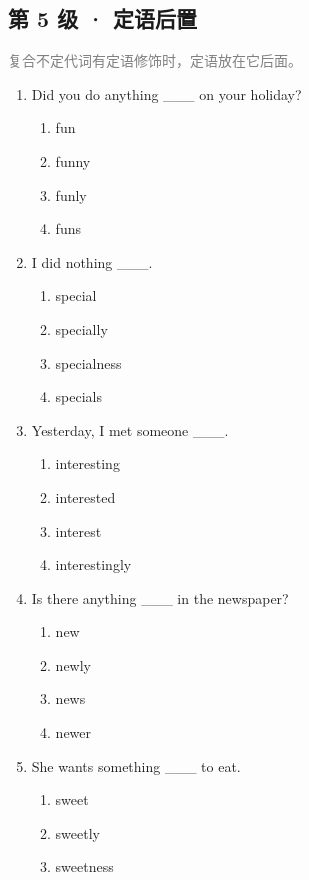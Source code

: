 \documentclass[11pt,a4paper]{ctexart}
\begin{document}
\subsection*{第 5 级 · 定语后置}
\noindent\textcolor{gray}{复合不定代词有定语修饰时，定语放在它后面。}\par\smallskip
\begin{enumerate}[leftmargin=*,itemsep=4pt]
\item Did you do anything \_\_\_ on your holiday?
\begin{enumerate}[label=\Alph*.,leftmargin=2em,itemsep=1pt,topsep=2pt]
\item fun
\item funny
\item funly
\item funs
\end{enumerate}
\item I did nothing \_\_\_.
\begin{enumerate}[label=\Alph*.,leftmargin=2em,itemsep=1pt,topsep=2pt]
\item special
\item specially
\item specialness
\item specials
\end{enumerate}
\item Yesterday, I met someone \_\_\_.
\begin{enumerate}[label=\Alph*.,leftmargin=2em,itemsep=1pt,topsep=2pt]
\item interesting
\item interested
\item interest
\item interestingly
\end{enumerate}
\item Is there anything \_\_\_ in the newspaper?
\begin{enumerate}[label=\Alph*.,leftmargin=2em,itemsep=1pt,topsep=2pt]
\item new
\item newly
\item news
\item newer
\end{enumerate}
\item She wants something \_\_\_ to eat.
\begin{enumerate}[label=\Alph*.,leftmargin=2em,itemsep=1pt,topsep=2pt]
\item sweet
\item sweetly
\item sweetness

\end{enumerate}
\end{enumerate}
\end{document}

